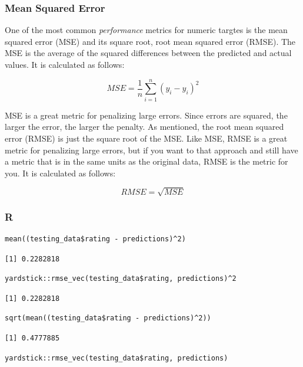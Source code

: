 \documentclass[
  letterpaper,
]{krantz}
\begin{document}
\subsubsection{Mean Squared Error}\label{sec-knowing-metrics-mse}

One of the most common \emph{performance} metrics for numeric targtes is
the mean squared error (MSE) and its square root, root mean squared
error (RMSE). The MSE is the average of the squared differences between
the predicted and actual values. It is calculated as follows:

\[MSE = \frac{1}{n}\sum_{i=1}^{n}(y_i - \hat{y}_i)^2\]

MSE is a great metric for penalizing large errors. Since errors are
squared, the larger the error, the larger the penalty. As mentioned, the
root mean squared error (RMSE) is just the square root of the MSE. Like
MSE, RMSE is a great metric for penalizing large errors, but if you want
to that approach and still have a metric that is in the same units as
the original data, RMSE is the metric for you. It is calculated as
follows:

\[RMSE = \sqrt{MSE}\]

\subsubsection{R}

\begin{verbatim}
mean((testing_data$rating - predictions)^2)
\end{verbatim}

\begin{verbatim}
[1] 0.2282818
\end{verbatim}

\begin{verbatim}
yardstick::rmse_vec(testing_data$rating, predictions)^2
\end{verbatim}

\begin{verbatim}
[1] 0.2282818
\end{verbatim}

\begin{verbatim}
sqrt(mean((testing_data$rating - predictions)^2))
\end{verbatim}

\begin{verbatim}
[1] 0.4777885
\end{verbatim}

\begin{verbatim}
yardstick::rmse_vec(testing_data$rating, predictions)
\end{verbatim}
\end{document}
